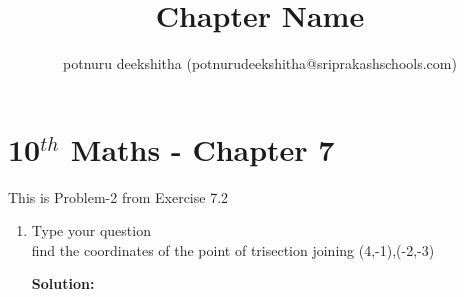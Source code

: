 \documentclass[12pt]{article}
\title{Chapter Name}
\author{potnuru deekshitha (potnurudeekshitha@sriprakashschools.com)}
\newcommand{\solution}{\noindent \textbf{Solution: }}
\begin{document}
\maketitle
\section*{10$^{th}$ Maths - Chapter 7}
This is Problem-2 from Exercise 7.2
\begin{enumerate}
\item Type your question \\ find the coordinates of the point of trisection joining (4,-1),(-2,-3)

\solution\\
\end{enumerate}
\end{document}
